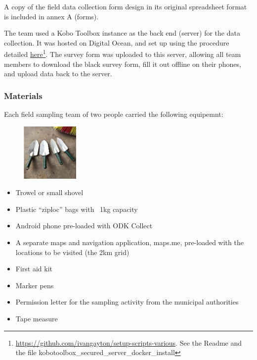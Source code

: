 \documentclass[a4paper,12pt]{article}
\begin{document}
A copy of the field data collection form design in its original spreadsheet format is included in annex A (forms).

The team used a Kobo Toolbox instance as the back end (server) for the data collection. It was hosted on Digital Ocean, and set up using the procedure detailed \href{https://github.com/ivangayton/setup-scripts-various}{here}\footnote{\url {https://github.com/ivangayton/setup-scripts-various}. See the Readme and the file kobotoolbox\_secured\_server\_docker\_install}. The survey form was uploaded to this server, allowing all team members to download the black survey form, fill it out offline on their phones, and upload data back to the server. 

\newpage
\subsubsection{Materials}
Each field sampling team of two people carried the following equipemnt:
\begin{figure}
  \centering
  \includegraphics[width=0.25\textwidth]{trowels.png}
\end{figure}

\begin{itemize}
  \item Trowel or small shovel
  \item Plastic ``ziploc'' bags with ~1kg capacity
  \item Android phone pre-loaded with ODK Collect
  \item A separate maps and navigation application, maps.me, pre-loaded with the locations to be visited (the 2km grid)
  \item First aid kit
  \item Marker pens
  \item Permission letter for the sampling activity from the municipal authorities
  \item Tape measure
\end{itemize}
\end{document}
